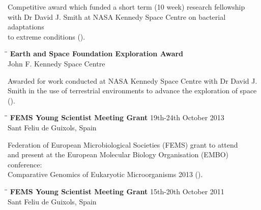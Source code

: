 \documentclass{res}
\begin{document}
\begin{resume}
\begin{tabbing}
   \end{tabbing}\vspace{-30pt}     
   Competitive award which funded a short term (10 week) research fellowship \\ with Dr David J. Smith at NASA Kennedy Space Centre on bacterial adaptations \\ to extreme conditions ().

   \vspace{-0.1in}  
 
   
   \begin{tabbing}
   \hspace{2in}\= \hspace{2.6in}\= \kill 
    {\bf Earth and Space Foundation Exploration Award} \> \\
                            \> 
                            \> John F. Kennedy Space Centre\\


   \end{tabbing}\vspace{-30pt}     
   Awarded for work conducted at NASA Kennedy Space Centre with Dr David J. \\ Smith in the use of terrestrial environments to advance the exploration of space ().

   \vspace{-0.1in}  
   
   \begin{tabbing}
   \hspace{2in}\= \hspace{2.6in}\= \kill 
    {\bf FEMS Young Scientist Meeting Grant} \> \> 19th-24th October 2013\\
                            \>  
                            \> Sant Feliu de Guixols, Spain \\
                       
   \end{tabbing}\vspace{-30pt}      

   Federation of European Microbiological Societies (FEMS) grant to attend\\ and present at the European Molecular Biology Organisation (EMBO) conference:\\ Comparative Genomics of Eukaryotic Microorganisms 2013 ().

 
 \vspace{-0.1in}  
   \begin{tabbing}
   \hspace{2in}\= \hspace{2.6in}\= \kill 
    {\bf FEMS Young Scientist Meeting Grant} \> \> 15th-20th October 2011\\
                            \>  
                            \> Sant Feliu de Guixols, Spain \\
                       

\end{tabbing}
\end{resume}
\end{document}
